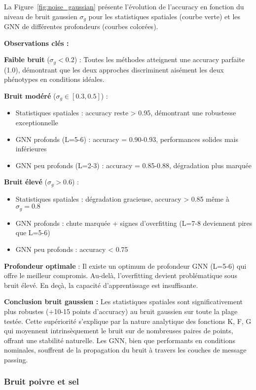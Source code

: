 La Figure~\ref{fig:noise_gaussian} présente l'évolution de l'accuracy en fonction du niveau de bruit gaussien $\sigma_g$ pour les statistiques spatiales (courbe verte) et les GNN de différentes profondeurs (courbes colorées).

\textbf{Observations clés :}

\textbf{Faible bruit} ($\sigma_g < 0.2$) : Toutes les méthodes atteignent une accuracy parfaite (1.0), démontrant que les deux approches discriminent aisément les deux phénotypes en conditions idéales.

\textbf{Bruit modéré} ($\sigma_g \in [0.3, 0.5]$) :
\begin{itemize}
    \item Statistiques spatiales : accuracy reste > 0.95, démontrant une robustesse exceptionnelle
    \item GNN profonds (L=5-6) : accuracy = 0.90-0.93, performances solides mais inférieures
    \item GNN peu profonds (L=2-3) : accuracy = 0.85-0.88, dégradation plus marquée
\end{itemize}

\textbf{Bruit élevé} ($\sigma_g > 0.6$) :
\begin{itemize}
    \item Statistiques spatiales : dégradation gracieuse, accuracy > 0.85 même à $\sigma_g = 0.8$
    \item GNN profonds : chute marquée + signes d'overfitting (L=7-8 deviennent pires que L=5-6)
    \item GNN peu profonds : accuracy < 0.75
\end{itemize}

\textbf{Profondeur optimale} : Il existe un optimum de profondeur GNN (L=5-6) qui offre le meilleur compromis. Au-delà, l'overfitting devient problématique sous bruit élevé. En deçà, la capacité d'apprentissage est insuffisante.

\textbf{Conclusion bruit gaussien :} Les statistiques spatiales sont significativement plus robustes (+10-15 points d'accuracy) au bruit gaussien sur toute la plage testée. Cette supériorité s'explique par la nature analytique des fonctions K, F, G qui moyennent intrinsèquement le bruit sur de nombreuses paires de points, offrant une stabilité naturelle. Les GNN, bien que performants en conditions nominales, souffrent de la propagation du bruit à travers les couches de message passing.

\subsubsection{Bruit poivre et sel}

